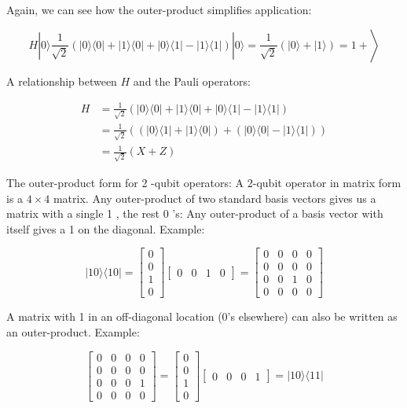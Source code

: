 \documentclass[main.tex]{subfiles}
\begin{document}
    Again, we can see how the outer-product simplifies application:
    
    $$
    \left.H|0\rangle \frac{1}{\sqrt{2}}(|0\rangle\langle 0|+| 1\rangle\langle 0|+| 0\rangle\langle 1|-| 1\rangle\langle 1|)|0\rangle=\frac{1}{\sqrt{2}}(|0\rangle+|1\rangle)=1+\right\rangle
    $$
    
    A relationship between $H$ and the Pauli operators:
    
    $$
    \begin{aligned}
    H &=\frac{1}{\sqrt{2}}(|0\rangle\langle 0|+| 1\rangle\langle 0|+| 0\rangle\langle 1|-| 1\rangle\langle 1|) \\
    &=\frac{1}{\sqrt{2}}((|0\rangle\langle 1|+| 1\rangle\langle 0|)+(|0\rangle\langle 0|-| 1\rangle\langle 1|)) \\
    &=\frac{1}{\sqrt{2}}(X+Z)
    \end{aligned}
    $$
    
    The outer-product form for 2 -qubit operators: A 2-qubit operator in matrix form is a $4 \times 4$ matrix. Any outer-product of two standard basis vectors gives us a matrix with a single 1 , the rest 0 's: Any outer-product of a basis vector with itself gives a 1 on the diagonal. Example:
    
    $$
    |10\rangle\langle 10|=\left[\begin{array}{l}
    0 \\
    0 \\
    1 \\
    0
    \end{array}\right]\left[\begin{array}{llll}
    0 & 0 & 1 & 0
    \end{array}\right]=\left[\begin{array}{llll}
    0 & 0 & 0 & 0 \\
    0 & 0 & 0 & 0 \\
    0 & 0 & 1 & 0 \\
    0 & 0 & 0 & 0
    \end{array}\right]
    $$
    
    A matrix with 1 in an off-diagonal location (0's elsewhere) can also be written as an outer-product. Example:
    
    $$
    \left[\begin{array}{llll}
    0 & 0 & 0 & 0 \\
    0 & 0 & 0 & 0 \\
    0 & 0 & 0 & 1 \\
    0 & 0 & 0 & 0
    \end{array}\right]=\left[\begin{array}{l}
    0 \\
    0 \\
    1 \\
    0
    \end{array}\right]\left[\begin{array}{llll}
    0 & 0 & 0 & 1
    \end{array}\right]=|10\rangle\langle 11|
    $$
    
\end{document}
